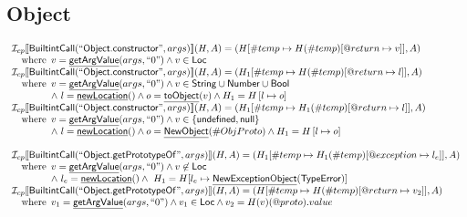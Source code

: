 \documentclass{article}
\makeatletter
\newcommand{\SF}[1]{\mbox{\textsf{#1}}}
\newcommand{\wherec}[1]{{\rm where}\begin{array}[t]{l}#1\end{array}}
\newcommand{\Loc}{\SF{Loc}}
\newcommand{\I}{\mathcal{I}}
\newcommand{\lbr}{\llbracket}
\newcommand{\rbr}{\rrbracket}
\newcommand{\hf}[1]{\underline{\sf #1}}
\newcommand{\varloc}[1]{\##1}
\newcommand{\varprop}[1]{@#1}
\makeatother
\begin{document}
\subsection{Object}

\[
\begin{array}{l}

\I _{cp}\lbr \SF{BuiltintCall}(``\SF{Object.constructor}",args)\rbr(H,A)
  = (H[\#temp \mapsto H(\#temp)[@return \mapsto v]], A)\\
 \quad\wherec{
   v = \hf{getArgValue}(args, ``0") \land v \in \SF{Loc}}\\
   
\I _{cp}\lbr \SF{BuiltintCall}(``\SF{Object.constructor}",args)\rbr(H,A)
  = (H_1[\#temp \mapsto H(\#temp)[@return \mapsto l]], A)\\
 \quad\wherec{
   v = \hf{getArgValue}(args, ``0") \land v \in \SF{String} \cup \SF{Number} \cup \SF{Bool}\\
   \land\ l=\hf{newLocation}() \land o=\hf{toObject}(v) \land H_1=H\left[l\mapsto o\right]}\\

\I _{cp}\lbr \SF{BuiltintCall}(``\SF{Object.constructor}",args)\rbr(H,A)
  = (H_1[\#temp \mapsto H_1(\#temp)[@return \mapsto l]], A)\\
 \quad\wherec{
   v = \hf{getArgValue}(args, ``0") \land v \in \{ \SF{undefined}, \SF{null} \}\\
   \land\ l=\hf{newLocation}() \land o=\hf{NewObject}(\#ObjProto) \land H_1=H\left[l\mapsto o\right]}\\
\\


\I _{cp}\lbr \SF{BuiltintCall}(``\SF{Object.getPrototypeOf}",args)\rbr(H,A)
 = (H_1[\varloc{temp}\mapsto H_1(\varloc{temp})[\varprop{exception}\mapsto l_{e}]], A) \\
\quad\wherec{
  v = \hf{getArgValue}(args, ``0") \land v\not\in\Loc\\
  \land\ l_e = \hf{newLocation}() \land\ H_1=H[l_e\mapsto\hf{NewExceptionObject}(\SF{TypeError})] }\\

\I _{cp}\lbr \SF{BuiltintCall}(``\SF{Object.getPrototypeOf}",args)\rbr(H,A)
 = (H[\#temp \mapsto H(\#temp)[@return \mapsto v_2]], A)\\
 \quad\wherec{
  v_1 = \hf{getArgValue}(args, ``0") \land v_1 \in\Loc \land v_2 = H(v)(@proto).value}\\
\\  

\end{array}
\]
\end{document}
